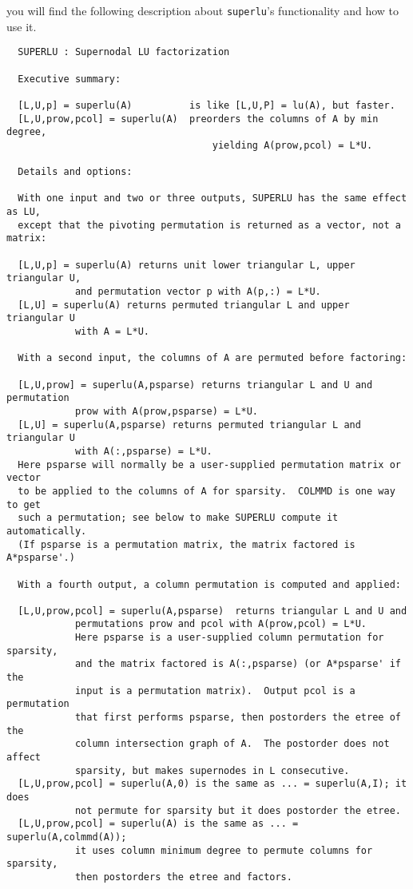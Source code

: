 \noindent you will find the following description about {\tt superlu}'s
functionality and how to use it.
\begin{verbatim}
  SUPERLU : Supernodal LU factorization
 
  Executive summary:

  [L,U,p] = superlu(A)          is like [L,U,P] = lu(A), but faster.
  [L,U,prow,pcol] = superlu(A)  preorders the columns of A by min degree,
                                    yielding A(prow,pcol) = L*U.

  Details and options:

  With one input and two or three outputs, SUPERLU has the same effect as LU,
  except that the pivoting permutation is returned as a vector, not a matrix:

  [L,U,p] = superlu(A) returns unit lower triangular L, upper triangular U,
            and permutation vector p with A(p,:) = L*U.
  [L,U] = superlu(A) returns permuted triangular L and upper triangular U
            with A = L*U.

  With a second input, the columns of A are permuted before factoring:

  [L,U,prow] = superlu(A,psparse) returns triangular L and U and permutation 
            prow with A(prow,psparse) = L*U.
  [L,U] = superlu(A,psparse) returns permuted triangular L and triangular U 
            with A(:,psparse) = L*U.
  Here psparse will normally be a user-supplied permutation matrix or vector
  to be applied to the columns of A for sparsity.  COLMMD is one way to get
  such a permutation; see below to make SUPERLU compute it automatically.
  (If psparse is a permutation matrix, the matrix factored is A*psparse'.)

  With a fourth output, a column permutation is computed and applied:

  [L,U,prow,pcol] = superlu(A,psparse)  returns triangular L and U and
            permutations prow and pcol with A(prow,pcol) = L*U.
            Here psparse is a user-supplied column permutation for sparsity,
            and the matrix factored is A(:,psparse) (or A*psparse' if the
            input is a permutation matrix).  Output pcol is a permutation
            that first performs psparse, then postorders the etree of the 
            column intersection graph of A.  The postorder does not affect 
            sparsity, but makes supernodes in L consecutive.
  [L,U,prow,pcol] = superlu(A,0) is the same as ... = superlu(A,I); it does
            not permute for sparsity but it does postorder the etree.
  [L,U,prow,pcol] = superlu(A) is the same as ... = superlu(A,colmmd(A));
            it uses column minimum degree to permute columns for sparsity,
            then postorders the etree and factors.
\end{verbatim}


